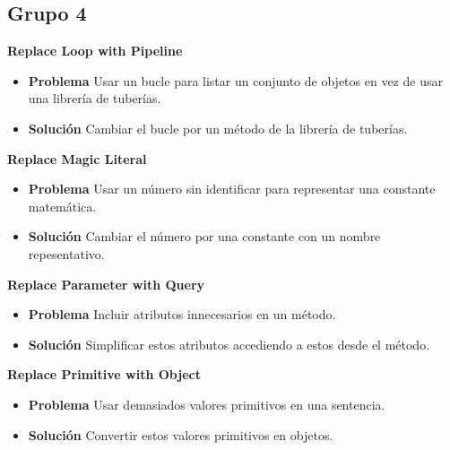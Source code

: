 \documentclass[11pt,a4paper,oneside]{book}
\begin{document}


\subsection{Grupo 4}
\textbf{Replace Loop with Pipeline}
\label{ReplaceLoopWithPipeline}
\begin{itemize}
    \item \textbf{Problema} Usar un bucle para listar un conjunto de objetos en vez de usar una librería de tuberías.
    
    
    \item \textbf{Solución} Cambiar el bucle por un método de la librería de tuberías.
    
\end{itemize}

\textbf{Replace Magic Literal}
\label{ReplaceMagicLiteral}
\begin{itemize}
    \item \textbf{Problema} Usar un número sin identificar para representar una constante matemática.
    
    
    \item \textbf{Solución} Cambiar el número por una constante con un nombre repesentativo.
    
\end{itemize}

\textbf{Replace Parameter with Query}
\label{ReplaceParameterWithQuery}
\begin{itemize}
    \item \textbf{Problema} Incluir atributos innecesarios en un método.
    
    
    \item \textbf{Solución} Simplificar estos atributos accediendo a estos desde el método.
    
\end{itemize}

\textbf{Replace Primitive with Object}
\label{ReplacePrimitiveWithObject}
\begin{itemize}
    \item \textbf{Problema} Usar demasiados valores primitivos en una sentencia.
    
    
    \item \textbf{Solución} Convertir estos valores primitivos en objetos.
    
\end{itemize}
\end{document}
